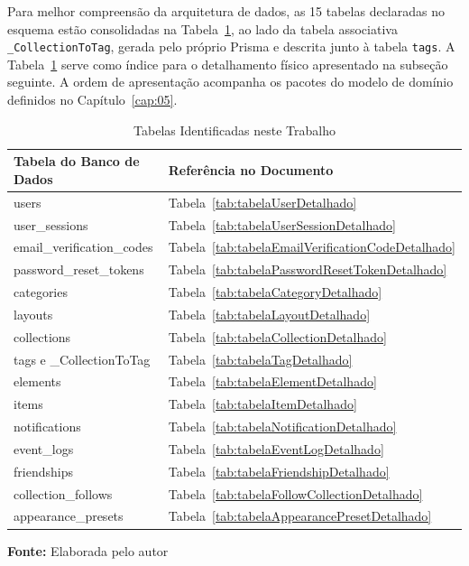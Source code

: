 Para melhor compreensão da arquitetura de dados, as 15 tabelas declaradas no esquema estão consolidadas na Tabela~\ref{tab:tabelasIdentificadas}, ao lado da tabela associativa \texttt{\_CollectionToTag}, gerada pelo próprio Prisma e descrita junto à tabela \texttt{tags}. A Tabela~\ref{tab:tabelasIdentificadas} serve como índice para o detalhamento físico apresentado na subseção seguinte. A ordem de apresentação acompanha os pacotes do modelo de domínio definidos no Capítulo~\ref{cap:05}.

\FloatBarrier
\begin{table}[!htbp]
\centering
\caption{Tabelas Identificadas neste Trabalho}
    \begin{tabularx}{\textwidth}{ | l | X | }
        \hline
        \textbf{Tabela do Banco de Dados} & \textbf{Referência no Documento} \\ \hline
        users & Tabela~\ref{tab:tabelaUserDetalhado} \\ \hline
        user\_sessions & Tabela~\ref{tab:tabelaUserSessionDetalhado} \\ \hline
        email\_verification\_codes & Tabela~\ref{tab:tabelaEmailVerificationCodeDetalhado} \\ \hline
        password\_reset\_tokens & Tabela~\ref{tab:tabelaPasswordResetTokenDetalhado} \\ \hline
        categories & Tabela~\ref{tab:tabelaCategoryDetalhado} \\ \hline
        layouts & Tabela~\ref{tab:tabelaLayoutDetalhado} \\ \hline
        collections & Tabela~\ref{tab:tabelaCollectionDetalhado} \\ \hline
        tags e \_CollectionToTag & Tabela~\ref{tab:tabelaTagDetalhado} \\ \hline
        elements & Tabela~\ref{tab:tabelaElementDetalhado} \\ \hline
        items & Tabela~\ref{tab:tabelaItemDetalhado} \\ \hline
        notifications & Tabela~\ref{tab:tabelaNotificationDetalhado} \\ \hline
        event\_logs & Tabela~\ref{tab:tabelaEventLogDetalhado} \\ \hline
        friendships & Tabela~\ref{tab:tabelaFriendshipDetalhado} \\ \hline
        collection\_follows & Tabela~\ref{tab:tabelaFollowCollectionDetalhado} \\ \hline
        appearance\_presets & Tabela~\ref{tab:tabelaAppearancePresetDetalhado} \\ \hline
    \end{tabularx}
    \vspace{0.2cm}
    \textbf{Fonte:} Elaborada pelo autor
    \label{tab:tabelasIdentificadas}
\end{table}
\FloatBarrier

